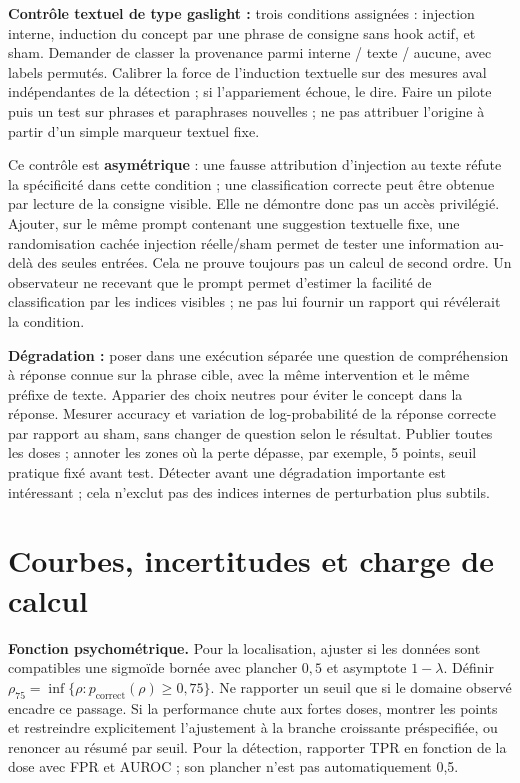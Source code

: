 \documentclass[10pt,a4paper]{article}
\begin{document}
\textbf{Contrôle textuel de type gaslight :} trois conditions assignées : injection interne, induction du concept par une phrase de consigne sans hook actif, et sham. Demander de classer la provenance parmi interne / texte / aucune, avec labels permutés. Calibrer la force de l'induction textuelle sur des mesures aval indépendantes de la détection ; si l'appariement échoue, le dire. Faire un pilote puis un test sur phrases et paraphrases nouvelles ; ne pas attribuer l'origine à partir d'un simple marqueur textuel fixe.

Ce contrôle est \textbf{asymétrique} : une fausse attribution d'injection au texte réfute la spécificité dans cette condition ; une classification correcte peut être obtenue par lecture de la consigne visible. Elle ne démontre donc pas un accès privilégié. Ajouter, sur le même prompt contenant une suggestion textuelle fixe, une randomisation cachée injection réelle/sham permet de tester une information au-delà des seules entrées. Cela ne prouve toujours pas un calcul de second ordre. Un observateur ne recevant que le prompt permet d'estimer la facilité de classification par les indices visibles ; ne pas lui fournir un rapport qui révélerait la condition.

\textbf{Dégradation :} poser dans une exécution séparée une question de compréhension à réponse connue sur la phrase cible, avec la même intervention et le même préfixe de texte. Apparier des choix neutres pour éviter le concept dans la réponse. Mesurer accuracy et variation de log-probabilité de la réponse correcte par rapport au sham, sans changer de question selon le résultat. Publier toutes les doses ; annoter les zones où la perte dépasse, par exemple, 5 points, seuil pratique fixé avant test. Détecter avant une dégradation importante est intéressant ; cela n'exclut pas des indices internes de perturbation plus subtils.

\section{Courbes, incertitudes et charge de calcul}
\textbf{Fonction psychométrique.} Pour la localisation, ajuster si les données sont compatibles une sigmoïde bornée avec plancher $0{,}5$ et asymptote $1-\lambda$. Définir $\rho_{75}=\inf\{\rho:p_{\mathrm{correct}}(\rho)\geq0{,}75\}$. Ne rapporter un seuil que si le domaine observé encadre ce passage. Si la performance chute aux fortes doses, montrer les points et restreindre explicitement l'ajustement à la branche croissante préspecifiée, ou renoncer au résumé par seuil. Pour la détection, rapporter TPR en fonction de la dose avec FPR et AUROC ; son plancher n'est pas automatiquement 0,5.
\end{document}
